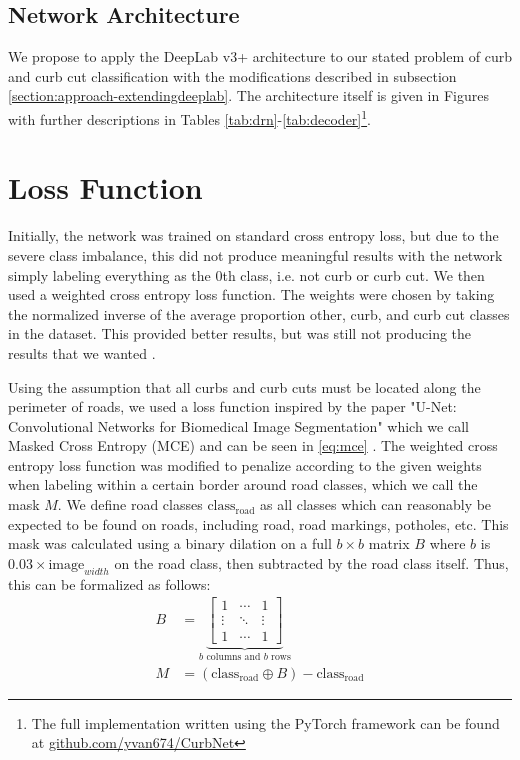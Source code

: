 \subsection{Network Architecture}\label{section:approach-networkarchitecture}
We propose to apply the DeepLab v3+ architecture to our stated problem of curb and curb cut classification with the modifications described in subsection \ref{section:approach-extendingdeeplab}.
The architecture itself is given in Figures  with further descriptions in Tables \ref{tab:drn}-\ref{tab:decoder}\footnote{The full implementation written using the PyTorch framework can be found at \url{github.com/yvan674/CurbNet}}.






\section{Loss Function}\label{section:approach-lossfunction}
Initially, the network was trained on standard cross entropy loss, but due to the severe class imbalance, this did not produce meaningful results with the network simply labeling everything as the 0th class, i.e. not curb or curb cut.
We then used a weighted cross entropy loss function.
The weights were chosen by taking the normalized inverse of the average proportion other, curb, and curb cut classes in the dataset.
This provided better results, but was still not producing the results that we wanted .

Using the assumption that all curbs and curb cuts must be located along the perimeter of roads, we used a loss function inspired by the paper "U-Net: Convolutional Networks for Biomedical Image Segmentation" which we call Masked Cross Entropy (MCE) and can be seen in \eqref{eq:mce} \cite{unet}.
The weighted cross entropy loss function was modified to penalize according to the given weights when labeling within a certain border around road classes, which we call the mask $M$.
We define road classes $\text{class}_{\text{road}}$ as all classes which can reasonably be expected to be found on roads, including road, road markings, potholes, etc.
This mask was calculated using a binary dilation on a full $b \times b$ matrix $B$ where $b$ is $0.03 \times \text{image}_{width}$ on the road class, then subtracted by the road class itself.
Thus, this can be formalized as follows:
\begin{align}
	B &= \underbrace{
			\begin{bmatrix}
				1  & \cdots & 1\\ 
				\vdots &  \ddots & \vdots\\ 
				1 &  \cdots & 1
				\end{bmatrix}}_{b \text{ columns and } b \text{ rows}} \\
	M &= \left(\text{class}_{\text{road}} \oplus B\right) - \text{class}_{\text{road}}
\end{align}

